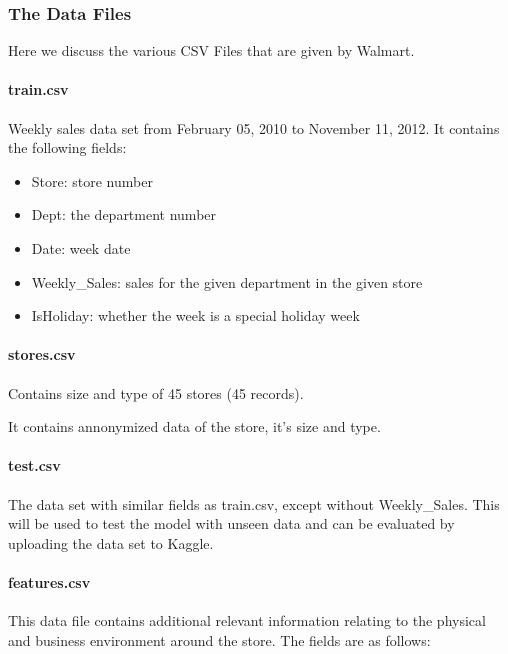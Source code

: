 \documentclass[]{article}
\begin{document}
\subsubsection{The Data Files}\label{the-data-files}

Here we discuss the various CSV Files that are given by Walmart.

\paragraph{train.csv}\label{train.csv}

Weekly sales data set from February 05, 2010 to November 11, 2012. It
contains the following fields:

\begin{itemize}
\itemsep1pt\parskip0pt
\item
  Store: store number
\item
  Dept: the department number
\item
  Date: week date
\item
  Weekly\_Sales: sales for the given department in the given store
\item
  IsHoliday: whether the week is a special holiday week
\end{itemize}

\paragraph{stores.csv}\label{stores.csv}

Contains size and type of 45 stores (45 records).

It contains annonymized data of the store, it's size and type.

\paragraph{test.csv}\label{test.csv}

The data set with similar fields as train.csv, except without
Weekly\_Sales. This will be used to test the model with unseen data and
can be evaluated by uploading the data set to Kaggle.

\paragraph{features.csv}\label{features.csv}

This data file contains additional relevant information relating to the
physical and business environment around the store. The fields are as
follows:
\end{document}
